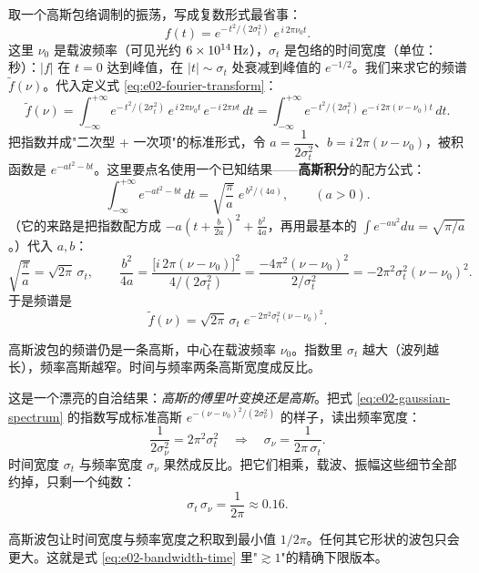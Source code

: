 取一个高斯包络调制的振荡，写成复数形式最省事：
\[
  f(t)=e^{-\,t^{2}/(2\sigma_t^{2})}\;e^{\,i\,2\pi\nu_0 t}.
\]
这里 \(\nu_0\) 是载波频率（可见光约 \(6\times10^{14}\,{\rm Hz}\)），\(\sigma_t\) 是包络的时间宽度（单位：秒）：\(|f|\) 在 \(t=0\) 达到峰值，在 \(|t|\sim\sigma_t\) 处衰减到峰值的 \(e^{-1/2}\)。我们来求它的频谱 \(\tilde f(\nu)\)。代入定义式 \eqref{eq:e02-fourier-transform}：
\[
  \tilde f(\nu)=\int_{-\infty}^{+\infty}
  e^{-\,t^{2}/(2\sigma_t^{2})}\,e^{\,i\,2\pi\nu_0 t}\,e^{-\,i\,2\pi\nu t}\,dt
  =\int_{-\infty}^{+\infty}
  e^{-\,t^{2}/(2\sigma_t^{2})}\,e^{-\,i\,2\pi(\nu-\nu_0)t}\,dt .
\]
把指数并成"二次型 + 一次项"的标准形式，令 \(a=\dfrac{1}{2\sigma_t^{2}}\)、\(b=i\,2\pi(\nu-\nu_0)\)，被积函数是 \(e^{-a t^{2}-b t}\)。这里要点名使用一个已知结果——\textbf{高斯积分}的配方公式：
\[
  \int_{-\infty}^{+\infty} e^{-a t^{2}-b t}\,dt
  =\sqrt{\frac{\pi}{a}}\;e^{\,b^{2}/(4a)},
  \qquad(a>0).
\]
（它的来路是把指数配方成 \(-a(t+\tfrac{b}{2a})^2+\tfrac{b^2}{4a}\)，再用最基本的 \(\int e^{-a u^2}du=\sqrt{\pi/a}\)。）代入 \(a,b\)：
\[
  \sqrt{\frac{\pi}{a}}=\sqrt{2\pi}\,\sigma_t,
  \qquad
  \frac{b^{2}}{4a}
  =\frac{\bigl[i\,2\pi(\nu-\nu_0)\bigr]^{2}}{4/(2\sigma_t^{2})}
  =\frac{-4\pi^{2}(\nu-\nu_0)^{2}}{2/\sigma_t^{2}}
  =-2\pi^{2}\sigma_t^{2}(\nu-\nu_0)^{2}.
\]
于是频谱是
\begin{equation}
  \tilde f(\nu)=\sqrt{2\pi}\,\sigma_t\;
  e^{-\,2\pi^{2}\sigma_t^{2}(\nu-\nu_0)^{2}}.
  \label{eq:e02-gaussian-spectrum}
\end{equation}
\begin{formulaexplain}
高斯波包的频谱仍是一条高斯，中心在载波频率 \(\nu_0\)。指数里 \(\sigma_t\) 越大（波列越长），频率高斯越窄。时间与频率两条高斯宽度成反比。
\end{formulaexplain}
这是一个漂亮的自洽结果：\emph{高斯的傅里叶变换还是高斯}。把式 \eqref{eq:e02-gaussian-spectrum} 的指数写成标准高斯 \(e^{-(\nu-\nu_0)^2/(2\sigma_\nu^2)}\) 的样子，读出频率宽度：
\[
  \frac{1}{2\sigma_\nu^{2}}=2\pi^{2}\sigma_t^{2}
  \quad\Longrightarrow\quad
  \sigma_\nu=\frac{1}{2\pi\,\sigma_t}.
\]
时间宽度 \(\sigma_t\) 与频率宽度 \(\sigma_\nu\) 果然成反比。把它们相乘，载波、振幅这些细节全部约掉，只剩一个纯数：
\begin{equation}
  \sigma_t\,\sigma_\nu=\frac{1}{2\pi}\approx0.16 .
  \label{eq:e02-gaussian-product}
\end{equation}
\begin{formulaexplain}
高斯波包让时间宽度与频率宽度之积取到最小值 \(1/2\pi\)。任何其它形状的波包只会更大。这就是式 \eqref{eq:e02-bandwidth-time} 里"\(\gtrsim 1\)"的精确下限版本。
\end{formulaexplain}
